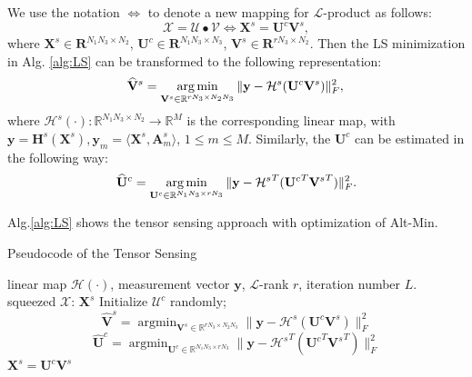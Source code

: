 \documentclass[futureinternet,article,submit,moreauthors,pdftex,10pt,a4paper]{Definitions/mdpi}
\theoremstyle{plain}
\theoremstyle{definition}
\theoremstyle{remark}
\begin{document}
We use the notation $\Leftrightarrow$ to denote a new mapping for $\mathcal{L}$-product as follows:
\begin{equation}
    \mathcal{X} = \mathcal{U}\bullet \mathcal{V} \Leftrightarrow \mathbf{X}^s = \mathbf{U}^c\mathbf{V}^s,
\end{equation}
where $\mathbf{X}^s \in \mathbf{R}^{N_1N_3 \times N_2}$, $\mathbf{U}^c \in \mathbf{R}^{N_1N_3 \times N_3}$, $\mathbf{V}^s \in \mathbf{R}^{rN_3 \times N_2}$. Then the LS minimization in Alg. \ref{alg:LS} can be transformed to the following representation:
\begin{equation}
    \widehat{\mathbf{V}}^s = 
    \mathop{\arg\min}_{ \mathbf{V}^s \in \mathbb{R}^{rN_3 \times N_2N_3}} \| \mathbf{y} - \mathcal{H}^s(\mathbf{U}^c\mathbf{V}^s) \|_F^2 , \\
\end{equation}
where $\mathcal{H}^s(\cdot):\mathbb{R}^{N_1N_3\times N_2} \to \mathbb{R}^{M}$ is the corresponding linear map, with $\mathbf{y} = \mathbf{H}^s(\mathbf{X}^s), \mathbf{y}_m = \langle \mathbf{X}^s, \mathbf{A}^s_m \rangle$, $1 \leq m \leq M$.
Similarly, the $\mathbf{U}^c$ can be estimated in the following way:
\begin{equation}
    \widehat{\mathbf{U}}^c = 
    \mathop{\arg\min}_{ \mathbf{U}^c \in \mathbb{R}^{N_1N_3 \times rN_3}} \| \mathbf{y} - {\mathcal{H}^s}^T({\mathbf{U}^c}^T{\mathbf{V}^s}^T) \|_F^2. \\
\end{equation}

Alg.\ref{alg:LS} shows the tensor sensing approach with optimization of Alt-Min.

\begin{algorithm}[htb]
    \caption{Pseudocode of the Tensor Sensing}
    \label{alg:TS}
    \begin{algorithmic}[1]
        \Require
        linear map $\mathcal{H}(\cdot)$, measurement vector $\mathbf{y}$, $\mathcal{L}$-rank $r$, iteration number $L$.
        \Ensure squeezed $\mathcal{X} $: $\mathbf{X}^s$
        \State Initialize $\mathcal{U}^c$ randomly;
        \State \[ \widehat{\mathbf{V}}^s = \mathop{\arg\min}_{ \mathbf{V}^s \in \mathbb{R}^{rN_3 \times N_2N_3}} \| \mathbf{y} - \mathcal{H}^s(\mathbf{U}^c\mathbf{V}^s) \|_F^2 \]
    \State \[ \widehat{\mathbf{U}}^c = \mathop{\arg\min}_{ \mathbf{U}^c \in \mathbb{R}^{N_1N_3 \times rN_3}} \| \mathbf{y} - {\mathcal{H}^s}^T({\mathbf{U}^c}^T{\mathbf{V}^s}^T) \|_F^2 \]
            \EndFor
        \State $\mathbf{X}^s = \mathbf{U}^c\mathbf{V}^s$
    \end{algorithmic}
\end{algorithm}
\end{document}
